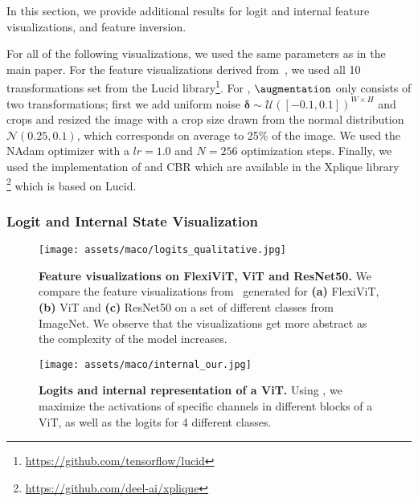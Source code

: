 






In this section, we provide additional results for logit and internal feature visualizations, and feature inversion. 

For all of the following visualizations, we used the same parameters as in the main paper.
For the feature visualizations derived from~\cite{olah2017feature}, we used all 10 transformations set from the Lucid library\footnote{\href{https://github.com/tensorflow/lucid}{https://github.com/tensorflow/lucid}}.
For \magfv, $\augmentation$ only consists of two transformations; first we add uniform noise $\bm{\delta} \sim \mathcal{U}([-0.1, 0.1])^{W \times H}$ and crops and resized the image with a crop size drawn from the normal distribution $\mathcal{N}(0.25, 0.1)$, which corresponds on average to 25\% of the image.
We used the NAdam optimizer \cite{dozat2016incorporating} with a $lr=1.0$ and $N = 256$ optimization steps. Finally, we used the implementation of \cite{olah2017feature} and CBR which are available in the Xplique library~\cite{fel2022xplique} \footnote{\href{https://github.com/deel-ai/xplique}{https://github.com/deel-ai/xplique}} which is based on Lucid.

\subsubsection{Logit and Internal State Visualization}\label{app:maco:fviz}

\begin{figure}[ht]
    \centering
    \texttt{[image: assets/maco/logits\_qualitative.jpg]}
    \caption{\textbf{Feature visualizations on FlexiViT, ViT and ResNet50.} We compare the feature visualizations from \magfv~generated for \textbf{(a)} FlexiViT, \textbf{(b)} ViT and \textbf{(c)} ResNet50 on a set of different classes from ImageNet. We observe that the visualizations get more abstract as the complexity of the model increases.}
    \label{fig:supp-qualitative}
\end{figure}

\begin{figure}[ht]
    \centering
    \texttt{[image: assets/maco/internal\_our.jpg]}
    \caption{\textbf{Logits and internal representation of a ViT.} Using \magfv, we maximize the activations of specific channels in different blocks of a ViT, as well as the logits for 4 different classes.}
    \label{fig:supp-internal}
\end{figure}

